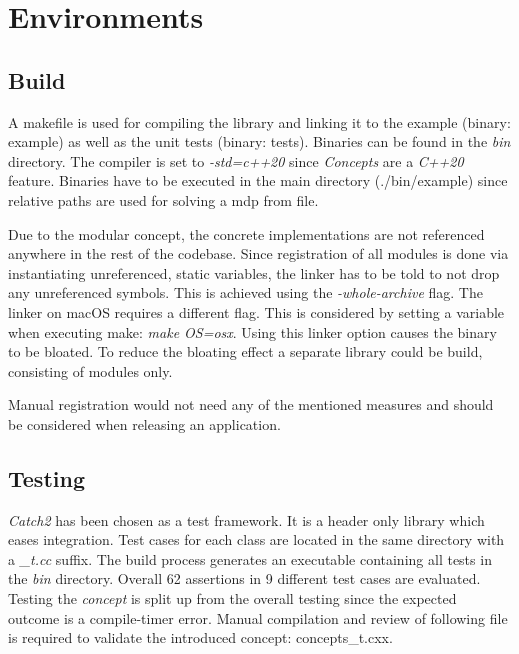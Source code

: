 \chapter{Environments}
\section{Build}
\label{build}

A makefile is used for compiling the library and linking it to the example (binary: example) as well as the unit tests (binary: tests). Binaries can be found in the \emph{bin} directory. The compiler is set to \emph{-std=c++20} since \emph{Concepts} are a \emph{C++20} feature. Binaries have to be executed in the main directory (./bin/example) since relative paths are used for solving a mdp from file. 

Due to the modular concept, the concrete implementations are not referenced anywhere in the rest of the codebase. Since registration of all modules is done via instantiating unreferenced, static variables, the linker has to be told to not drop any unreferenced symbols. This is achieved using the \emph{-whole-archive} flag. The linker on macOS requires a different flag. This is considered by setting a variable when executing make: \emph{make OS=osx}. Using this linker option causes the binary to be bloated. To reduce the bloating effect a separate library could be build, consisting of modules only.  

Manual registration would not need any of the mentioned measures and should be considered when releasing an application. 


\section{Testing}

\emph{Catch2} \autocite{Catch} has been chosen as a test framework. It is a header only library which eases integration. Test cases for each class are located in the same directory with a \emph{\_t.cc} suffix. The build process generates an executable containing all tests in the \emph{bin} directory. Overall 62 assertions in 9 different test cases are evaluated. 
Testing the \emph{concept} is split up from the overall testing since the expected outcome is a compile-timer error. Manual compilation and review of following file is required to validate the introduced concept: concepts\_t.cxx.